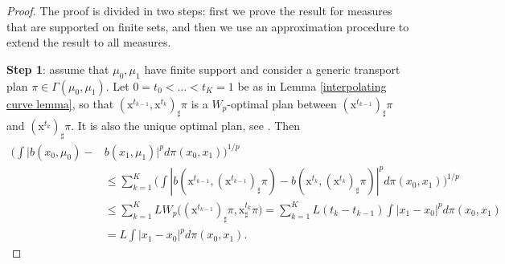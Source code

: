 \documentclass[10pt,leqno]{amsart}
\numberwithin{equation}{section}
\begin{document}
    \begin{proof}
        The proof is divided in two steps: first we prove the result for measures that are supported on finite sets, and then we use an approximation procedure to extend the result to all measures.

        \textbf{Step 1}: assume that $\mu_0,\mu_1$ have finite support and consider a generic transport plan $\pi\in \Gamma(\mu_0,\mu_1)$. Let $0=t_0<\dots<t_K = 1$ be as in Lemma \ref{interpolating curve lemma}, so that $(\mathrm{x}^{t_{k-1}},\mathrm{x}^{t_k})_\sharp \pi$ is a $W_p$-optimal plan between $(\mathrm{x}^{t_{k-1}})_\sharp \pi$ and $(\mathrm{x}^{t_k})_\sharp \pi$. It is also the unique optimal plan, see \cite[Lemma 7.2.1 and Theorem 7.2.2]{ambrosio2005gradient}. Then 
        \begin{align*}
            \bigg( \int |b(x_0, \mu_0) - & b(x_1,\mu_1)|^p d\pi(x_0,x_1)\bigg)^{1/p}
            \\
            & \leq 
            \sum_{k=1}^K \bigg(\int |b(\mathrm{x}^{t_{k-1}},  (\mathrm{x}^{t_{k-1}})_\sharp \pi) - b(\mathrm{x}^{t_{k}},(\mathrm{x}^{t_{k}})_\sharp \pi)|^p d\pi(x_0,x_1)\bigg)^{1/p}
            \\
            & \leq  \sum_{k=1}^K L W_p\big((\mathrm{x}^{t_{k-1}})_\sharp \pi, \mathrm{x}^{t_{k}}_\sharp \pi\big) 
            =  
            \sum_{k=1}^K L(t_k-t_{k-1}) \int|x_1-x_0|^p d\pi(x_0,x_1) 
            \\
            & = L \int|x_1-x_0|^p d\pi(x_0,x_1) .
        \end{align*}


\end{proof}
\end{document}

